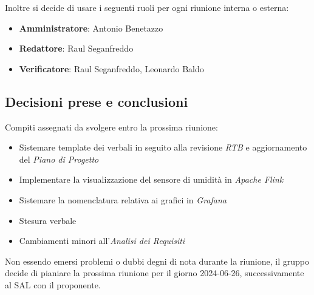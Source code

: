 \documentclass[italian,12pt]{article}
\begin{document}
Inoltre si decide di usare i seguenti ruoli per ogni riunione interna o esterna:
\begin{itemize}
	\item \textbf{Amministratore}: Antonio Benetazzo
	\item \textbf{Redattore}: Raul Seganfreddo
	\item \textbf{Verificatore}: Raul Seganfreddo, Leonardo Baldo
\end{itemize}

\subsection{Decisioni prese e conclusioni}
Compiti assegnati da svolgere entro la prossima riunione:
\begin{itemize}
	\item Sistemare template dei verbali in seguito alla revisione \textit{RTB} e aggiornamento del \textit{Piano di Progetto}
	\item Implementare la visualizzazione del sensore di umidità in \textit{Apache Flink}
	\item Sistemare la nomenclatura relativa ai grafici in \textit{Grafana}
	\item Stesura verbale
	\item Cambiamenti minori all'\textit{Analisi dei Requisiti}
\end{itemize}
Non essendo emersi problemi o dubbi degni di nota durante la riunione, il gruppo decide di pianiare la prossima
riunione per il giorno 2024-06-26, successivamente al SAL con il proponente.
\end{document}
